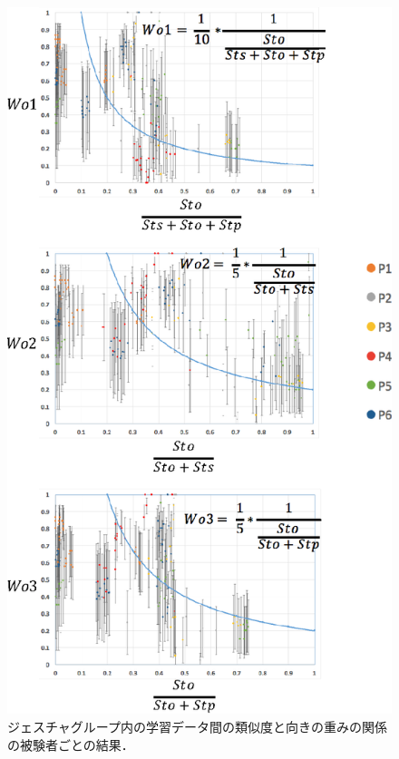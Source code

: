 \begin{figure}[!h]
\centering
\includegraphics[width=0.7\columnwidth]{img/weight_orientation.eps}
\caption{ジェスチャグループ内の学習データ間の類似度と向きの重みの関係の被験者ごとの結果．}
\label{fig:weight_orientation}
\end{figure}

